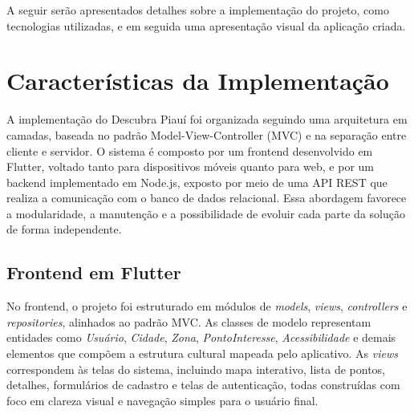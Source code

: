 

A seguir serão apresentados detalhes sobre a implementação do projeto, como tecnologias utilizadas, e em seguida uma apresentação visual da aplicação criada. 


\section{Características da Implementação} \label{sec:caracteristicas}

A implementação do Descubra Piauí foi organizada seguindo uma arquitetura em camadas, baseada no padrão Model-View-Controller (MVC) e na separação entre cliente e servidor. O sistema é composto por um frontend desenvolvido em Flutter, voltado tanto para dispositivos móveis quanto para web, e por um backend implementado em Node.js, exposto por meio de uma API REST que realiza a comunicação com o banco de dados relacional. Essa abordagem favorece a modularidade, a manutenção e a possibilidade de evoluir cada parte da solução de forma independente.

\subsection{Frontend em Flutter}

No frontend, o projeto foi estruturado em módulos de \textit{models}, \textit{views}, \textit{controllers} e \textit{repositories}, alinhados ao padrão MVC. As classes de modelo representam entidades como \textit{Usuário}, \textit{Cidade}, \textit{Zona}, \textit{PontoInteresse}, \textit{Acessibilidade} e demais elementos que compõem a estrutura cultural mapeada pelo aplicativo. As \textit{views} correspondem às telas do sistema, incluindo mapa interativo, lista de pontos, detalhes, formulários de cadastro e telas de autenticação, todas construídas com foco em clareza visual e navegação simples para o usuário final.


